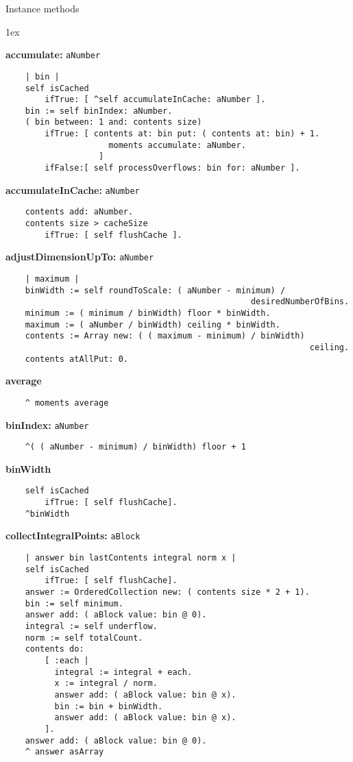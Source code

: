 Instance methods
{\parskip 1ex\par\noindent}
{\bf accumulate:} {\tt aNumber}
\begin{verbatim}
    | bin |
    self isCached
        ifTrue: [ ^self accumulateInCache: aNumber ].
    bin := self binIndex: aNumber.
    ( bin between: 1 and: contents size)
        ifTrue: [ contents at: bin put: ( contents at: bin) + 1.
                     moments accumulate: aNumber.
                   ]
        ifFalse:[ self processOverflows: bin for: aNumber ].
\end{verbatim}
{\bf accumulateInCache:} {\tt aNumber}
\begin{verbatim}
    contents add: aNumber.
    contents size > cacheSize
        ifTrue: [ self flushCache ].
\end{verbatim}
{\bf adjustDimensionUpTo:} {\tt aNumber}
\begin{verbatim}
    | maximum |
    binWidth := self roundToScale: ( aNumber - minimum) / 
                                                  desiredNumberOfBins.
    minimum := ( minimum / binWidth) floor * binWidth.
    maximum := ( aNumber / binWidth) ceiling * binWidth.
    contents := Array new: ( ( maximum - minimum) / binWidth) 
                                                              ceiling.
    contents atAllPut: 0.
\end{verbatim}
{\bf average}
\begin{verbatim}
    ^ moments average
\end{verbatim}
{\bf binIndex:} {\tt aNumber}
\begin{verbatim}
    ^( ( aNumber - minimum) / binWidth) floor + 1
\end{verbatim}
{\bf binWidth}
\begin{verbatim}
    self isCached
        ifTrue: [ self flushCache].
    ^binWidth
\end{verbatim}
{\bf collectIntegralPoints:} {\tt aBlock}
\begin{verbatim}
    | answer bin lastContents integral norm x |
    self isCached
        ifTrue: [ self flushCache].
    answer := OrderedCollection new: ( contents size * 2 + 1).
    bin := self minimum.
    answer add: ( aBlock value: bin @ 0).
    integral := self underflow.
    norm := self totalCount.
    contents do:
        [ :each |
          integral := integral + each.
          x := integral / norm.
          answer add: ( aBlock value: bin @ x).
          bin := bin + binWidth.
          answer add: ( aBlock value: bin @ x).
        ].
    answer add: ( aBlock value: bin @ 0).
    ^ answer asArray
\end{verbatim}
